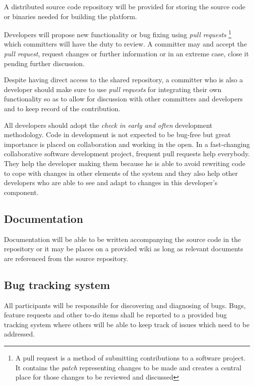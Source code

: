 A distributed source code repository will be provided for storing the source code or binaries
needed for building the \learnpad platform.

Developers will propose new functionality or bug fixing using \emph{pull requests}
\footnote{A pull request is a method of submitting contributions to a software project.
It contains the \emph{patch} representing changes to be made and creates a central place
for those changes to be reviewed and discussed}
which committers will have the duty to review. A committer may and accept the \emph{pull request},
request changes or further information or in an extreme case, close it pending further discussion.

Despite having direct access to the shared repository, a committer who is also a developer should
make sure to use \emph{pull requests} for integrating their own functionality so as to allow for
discussion with other committers and developers and to keep record of the contribution.

All developers should adopt the \emph{check in early and often} development methodology.
Code in development is not expected to be bug-free but great importance is placed on collaboration
and working in the open. In a fast-changing collaborative software development project, frequent
pull requests help everybody. They help the developer making them because he is able to avoid
rewriting code to cope with changes in other elements of the system and they also help other
developers who are able to see and adapt to changes in this developer's component.

\subsection{Documentation}
\label{sec:documentation}

Documentation will be able to be written accompanying the source code in the repository or it
may be places on a provided wiki as long as relevant documents are referenced from the source
repository.

\subsection{Bug tracking system}
\label{sec:bug tracking-system}

All participants will be responsible for discovering and diagnosing of bugs. Bugs, feature
requests and other to-do items shall be reported to a provided bug tracking system where others
will be able to keep track of issues which need to be addressed.

